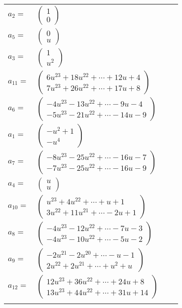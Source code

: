 \documentclass[1p]{elsarticle_modified}
\theoremstyle{definition}
\begin{document}
\begin{tabular}{m{7pt} m{180pt} m{7pt} m{180pt} }
\flushright $a_{2}=$&$\begin{pmatrix}1\\0\end{pmatrix}$ \\
\flushright $a_{5}=$&$\begin{pmatrix}0\\u\end{pmatrix}$ \\
\flushright $a_{3}=$&$\begin{pmatrix}1\\u^2\end{pmatrix}$ \\
\flushright $a_{11}=$&$\begin{pmatrix}6 u^{23}+18 u^{22}+\cdots+12 u+4\\7 u^{23}+26 u^{22}+\cdots+17 u+8\end{pmatrix}$ \\
\flushright $a_{6}=$&$\begin{pmatrix}-4 u^{23}-13 u^{22}+\cdots-9 u-4\\-5 u^{23}-21 u^{22}+\cdots-14 u-9\end{pmatrix}$ \\
\flushright $a_{1}=$&$\begin{pmatrix}- u^2+1\\- u^4\end{pmatrix}$ \\
\flushright $a_{7}=$&$\begin{pmatrix}-8 u^{23}-25 u^{22}+\cdots-16 u-7\\-7 u^{23}-25 u^{22}+\cdots-16 u-9\end{pmatrix}$ \\
\flushright $a_{4}=$&$\begin{pmatrix}u\\u\end{pmatrix}$ \\
\flushright $a_{10}=$&$\begin{pmatrix}u^{23}+4 u^{22}+\cdots+u+1\\3 u^{22}+11 u^{21}+\cdots-2 u+1\end{pmatrix}$ \\
\flushright $a_{8}=$&$\begin{pmatrix}-4 u^{23}-12 u^{22}+\cdots-7 u-3\\-4 u^{23}-10 u^{22}+\cdots-5 u-2\end{pmatrix}$ \\
\flushright $a_{9}=$&$\begin{pmatrix}-2 u^{21}-2 u^{20}+\cdots- u-1\\2 u^{22}+2 u^{21}+\cdots+u^2+u\end{pmatrix}$ \\
\flushright $a_{12}=$&$\begin{pmatrix}12 u^{23}+36 u^{22}+\cdots+24 u+8\\13 u^{23}+44 u^{22}+\cdots+31 u+14\end{pmatrix}$\\&\end{tabular}
\end{document}
